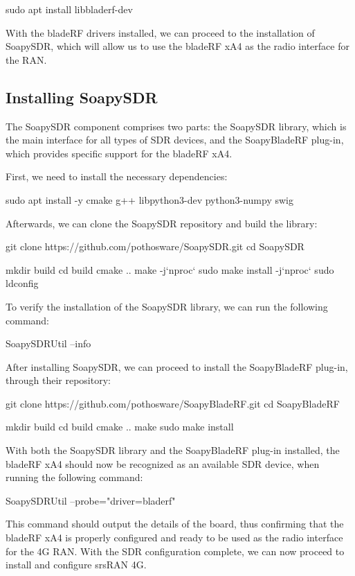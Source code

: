 \begin{code}
sudo apt install libbladerf-dev
\end{code}
With the bladeRF drivers installed, we can proceed to the installation of SoapySDR, which will allow us to use the bladeRF xA4 as the radio interface for the \gls{RAN}.

\subsection{Installing SoapySDR}
\label{sec:SoapySDR}

The SoapySDR component comprises two parts: the SoapySDR library, which is the main interface for all types of \gls{SDR} devices, and the SoapyBladeRF plug-in, which provides specific support for the bladeRF xA4.

First, we need to install the necessary dependencies:
\begin{code}
sudo apt install -y cmake g++ libpython3-dev python3-numpy swig
\end{code}
Afterwards, we can clone the SoapySDR repository and build the library:
\begin{code}
git clone https://github.com/pothosware/SoapySDR.git
cd SoapySDR

mkdir build
cd build
cmake ..
make -j`nproc`
sudo make install -j`nproc`
sudo ldconfig
\end{code}
To verify the installation of the SoapySDR library, we can run the following command:
\begin{code}
SoapySDRUtil --info
\end{code}
After installing SoapySDR, we can proceed to install the SoapyBladeRF plug-in, through their repository:
\begin{code}
git clone https://github.com/pothosware/SoapyBladeRF.git
cd SoapyBladeRF

mkdir build
cd build
cmake ..
make
sudo make install
\end{code}
With both the SoapySDR library and the SoapyBladeRF plug-in installed, the bladeRF xA4 should now be recognized as an available \gls{SDR} device, when running the following command:
\begin{code}
SoapySDRUtil --probe="driver=bladerf"
\end{code}
This command should output the details of the board, thus confirming that the bladeRF xA4 is properly configured and ready to be used as the radio interface for the 4G \gls{RAN}. With the \gls{SDR} configuration complete, we can now proceed to install and configure srsRAN 4G.

